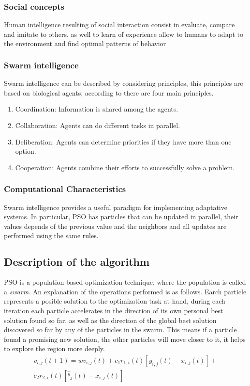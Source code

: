 \documentclass[journal]{IEEEtran}
\begin{document}
\subsubsection{ Social concepts }
Human intelligence resulting of social interaction consist in evaluate, compare and imitate to others, as well to learn of experience allow to humans to adapt to the environment and find optimal patterns of behavior

\subsubsection{ Swarm intelligence }
Swarm intelligence can be described by considering principles, this principles are based on biological agents; according to \cite{Garnier2007} there are four main principles.
\begin{enumerate}
    \item Coordination: Information is shared among the agents.
    \item Collaboration: Agents can do different tasks in parallel.
    \item Deliberation: Agents can determine priorities if they have more than one option.
    \item Cooperation: Agents combine their efforts to successfully solve a problem.
\end{enumerate}
\subsubsection{ Computational Characteristics }
Swarm intelligence provides a useful paradigm for implementing adaptative systems. In particular, PSO has particles that can be updated in parallel, their values depends of the previous value and the neighbors and all updates are performed using the same rules.
\subsection{Description of the algorithm}
PSO is a population based optimization technique, where the population is called a \textit{swarm}. An explanation of the operations performed is as follows. Earch particle represents a posible solution to the optimization task at hand, during each iteration each particle accelerates in the direction of its own personal best solution found so far, as well as the direction of the global best solution discovered so far by any of the particles in the swarm. This means if a particle found a promising new solution, the other particles will move closer to it, it helps to explore the region more deeply.
\\
\begin{equation} \label{eq:1}
    \begin{aligned}
    v_{i,j}(t+1)=wv_{i,j}(t)+c_1r_{1,i}(t)[y_{i,j}(t)-x_{i,j}(t)]+\\c_2r_{2,i}(t)[\hat{^y}_j(t)-x_{i,j}(t)]
    \end{aligned}
\end{equation}
\end{document}
